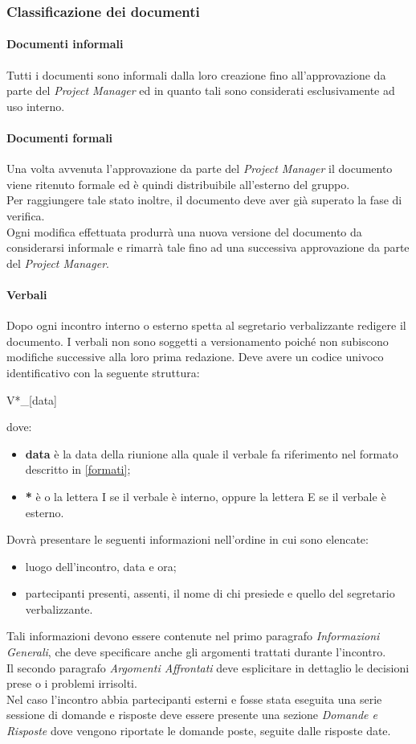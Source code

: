 	\subsubsection{Classificazione dei documenti}
		\paragraph{Documenti informali}\Spazio
		Tutti i documenti sono informali dalla loro creazione fino all'approvazione da parte del \emph{Project Manager} ed in quanto tali sono considerati esclusivamente ad uso interno.
		\paragraph{Documenti formali}\Spazio
		Una volta avvenuta l'approvazione da parte del \emph{Project Manager} il documento viene ritenuto formale ed è quindi distribuibile all'esterno del gruppo.\\
		Per raggiungere tale stato inoltre, il documento deve aver già superato la fase di verifica. \\
Ogni modifica effettuata produrrà una nuova versione del documento da considerarsi informale e rimarrà tale fino ad una successiva approvazione da parte del \emph{Project Manager}.
		\paragraph{Verbali}\Spazio
		\label{verbali}
		Dopo ogni incontro interno o esterno spetta al segretario verbalizzante redigere il documento. I verbali non sono soggetti a versionamento poiché non subiscono modifiche successive alla loro prima redazione. Deve avere un codice univoco identificativo con la seguente struttura: 
		\newline
		\centerline{V*\_[data]} 
		dove: 
    \begin{itemize} 
\item \textbf{data} è la data della riunione alla quale il verbale fa riferimento nel formato descritto in \ref{formati}; 
\item \textbf{*} è o la lettera I se il verbale è interno, oppure la lettera E se il verbale è esterno.
\end{itemize}
Dovrà presentare le seguenti informazioni nell'ordine in cui sono elencate:
\begin{itemize}
\item luogo dell'incontro, data e ora;
\item partecipanti presenti, assenti, il nome di chi presiede e quello del segretario verbalizzante.
\end{itemize}
Tali informazioni devono essere contenute nel primo paragrafo \textit{Informazioni Generali}, che deve specificare anche gli argomenti trattati durante l'incontro.\\
Il secondo paragrafo \textit{Argomenti Affrontati} deve esplicitare in dettaglio le decisioni prese o i problemi irrisolti.\\
Nel caso l'incontro abbia partecipanti esterni e fosse stata eseguita una serie sessione di domande e risposte deve essere presente una sezione  \textit{Domande e Risposte} dove vengono riportate le domande poste, seguite dalle risposte date.
